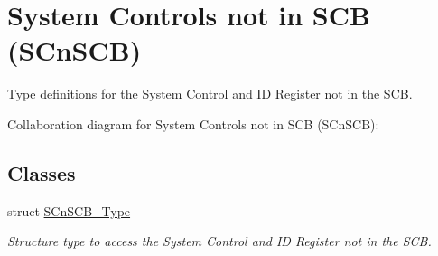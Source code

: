 \hypertarget{group___c_m_s_i_s___s_cn_s_c_b}{}\section{System Controls not in S\+CB (S\+Cn\+S\+CB)}
\label{group___c_m_s_i_s___s_cn_s_c_b}


Type definitions for the System Control and ID Register not in the S\+CB.  


Collaboration diagram for System Controls not in S\+CB (S\+Cn\+S\+CB)\+:
\subsection*{Classes}
\begin{DoxyCompactItemize}
\item 
struct \hyperlink{struct_s_cn_s_c_b___type}{S\+Cn\+S\+C\+B\+\_\+\+Type}
\begin{DoxyCompactList}\small\item\em Structure type to access the System Control and ID Register not in the S\+CB. \end{DoxyCompactList}\end{DoxyCompactItemize}
